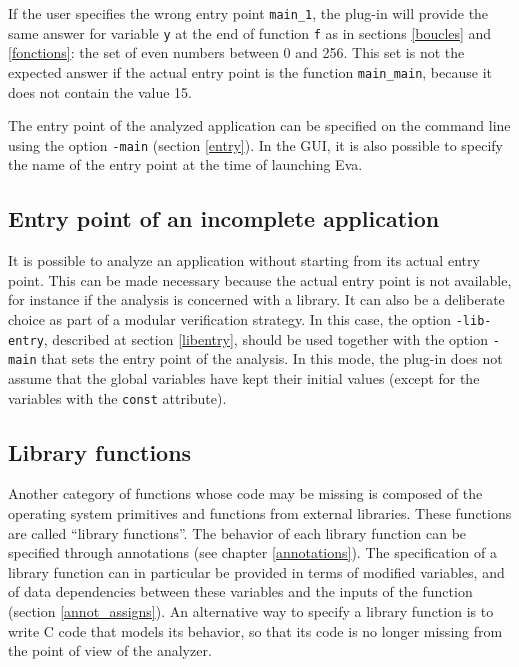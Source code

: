\documentclass[web]{frama-c-book}
\newcommand{\Eva}{\textsf{Eva}}
\begin{document}

If the user specifies the wrong
entry point \lstinline|main_1|, the plug-in will provide the
same answer for variable \lstinline|y| at the end of function \lstinline|f| as
in sections \ref{boucles} and \ref{fonctions}: the set of even numbers
between 0 and 256. This set is not the expected answer if the actual
entry point is the function \lstinline|main_main|, because it does not
contain the value 15.

The entry point of the analyzed application can be specified
on the command line using the option \lstinline|-main| (section \ref{entry}).
In the GUI,
it is also possible to specify the name of the entry point at
the time of launching \Eva{}.

\subsection{Entry point of an incomplete application}

It is possible to analyze an application without starting from its
actual entry point. This can be made necessary because the actual
entry point is not available, for instance if the analysis is
concerned with a library. It can also be a deliberate choice as part
of a modular verification strategy.  In this case, the option
\lstinline|-lib-entry|, described at section \ref{libentry}, should be used
together with the option \lstinline|-main| that sets the entry point of the
analysis.  In this mode, the plug-in does not assume that the global
variables have kept their initial values (except for the variables
with the \lstinline|const| attribute).

\subsection{Library functions}

Another category of functions whose code may be missing is composed
of the operating system primitives and functions from external libraries.
These functions are called ``library functions''.
The behavior of each library function can be specified through
annotations (see chapter \ref{annotations}).
The specification of a library function can in particular be
provided in terms of modified variables, and of data dependencies
between these variables and the inputs of the function
(section \ref{annot_assigns}). An alternative way to specify
a library function is to write C code that models its behavior,
so that its code is no longer missing from the point of view of the
analyzer.
\end{document}
